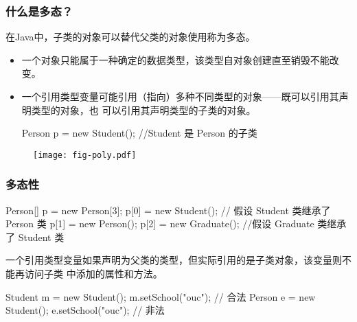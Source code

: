 \begin{frame}[fragile] %
  \frametitle{什么是多态？}

  在Java中，子类的对象可以替代父类的对象使用称为{\hei 多态}。

  
  \begin{itemize}[<+-| structure@+>]\kai
  \item 一个对象只能属于一种确定的数据类型，该类型自对象创建直至销毁不能改变。
  \item 一个引用类型变量可能引用（指向）多种不同类型的对象——既可以引用其声明类型的对象，也
    可以引用其声明类型的子类的对象。
    \begin{javaCode}
      Person p = new Student(); //Student 是 Person 的子类  
    \end{javaCode}
  \end{itemize}

  \begin{figure}
    \centering
    \texttt{[image: fig-poly.pdf]}
  \end{figure}
\end{frame}

\begin{frame}[fragile] %
\frametitle{多态性}


\begin{javaCode}
  Person[] p = new Person[3]; 
  p[0] = new Student(); // 假设 Student 类继承了 Person 类
  p[1] = new Person();
  p[2] = new Graduate(); //假设 Graduate 类继承了 Student 类
\end{javaCode}

\pause


一个引用类型变量如果声明为父类的类型，但实际引用的是子类对象，该变量则不能再访问子类
中添加的属性和方法。

\begin{javaCode}
  Student m = new Student();
  m.setSchool("ouc"); // 合法
  Person e = new Student();
  e.setSchool("ouc"); // 非法
\end{javaCode}

\end{frame}

